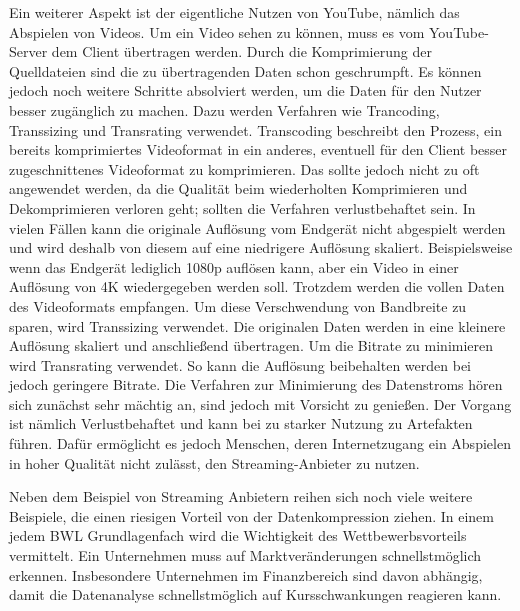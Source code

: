Ein weiterer Aspekt ist der eigentliche Nutzen von YouTube, nämlich das Abspielen von Videos.
Um ein Video sehen zu können, muss es vom YouTube-Server dem Client übertragen werden.
Durch die Komprimierung der Quelldateien sind die zu übertragenden Daten schon geschrumpft.
Es können jedoch noch weitere Schritte absolviert werden, um die Daten für den Nutzer besser zugänglich zu machen.
Dazu werden Verfahren wie Trancoding, Transsizing und Transrating verwendet.
Transcoding beschreibt den Prozess, ein bereits komprimiertes Videoformat in ein anderes, eventuell für den Client besser zugeschnittenes Videoformat zu komprimieren.
Das sollte jedoch nicht zu oft angewendet werden, da die Qualität beim wiederholten Komprimieren und Dekomprimieren verloren geht; sollten die Verfahren verlustbehaftet sein. \newline
In vielen Fällen kann die originale Auflösung vom Endgerät nicht abgespielt werden und wird deshalb von diesem auf eine niedrigere Auflösung skaliert.
Beispielsweise wenn das Endgerät lediglich 1080p auflösen kann, aber ein Video in einer Auflösung von 4K wiedergegeben werden soll.
Trotzdem werden die vollen Daten des Videoformats empfangen.
Um diese Verschwendung von Bandbreite zu sparen, wird Transsizing verwendet.
Die originalen Daten werden in eine kleinere Auflösung skaliert und anschließend übertragen. \newline
Um die Bitrate zu minimieren wird Transrating verwendet.
So kann die Auflösung beibehalten werden bei jedoch geringere Bitrate.
Die Verfahren zur Minimierung des Datenstroms hören sich zunächst sehr mächtig an, sind jedoch mit Vorsicht zu genießen.
Der Vorgang ist nämlich Verlustbehaftet und kann bei zu starker Nutzung zu Artefakten führen.
Dafür ermöglicht es jedoch Menschen, deren Internetzugang ein Abspielen in hoher Qualität nicht zulässt, den Streaming-Anbieter zu nutzen. \newline

Neben dem Beispiel von Streaming Anbietern reihen sich noch viele weitere Beispiele, die einen riesigen Vorteil von der Datenkompression ziehen.
In einem jedem BWL Grundlagenfach wird die Wichtigkeit des Wettbewerbsvorteils vermittelt.
Ein Unternehmen muss auf Marktveränderungen schnellstmöglich erkennen.
Insbesondere Unternehmen im Finanzbereich sind davon abhängig, damit die Datenanalyse schnellstmöglich auf Kursschwankungen reagieren kann.

